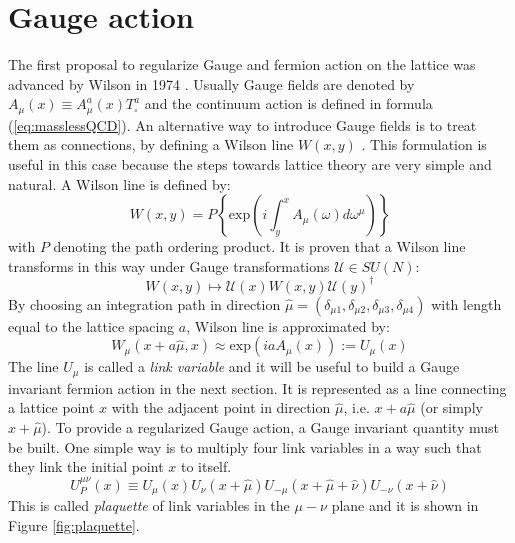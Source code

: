 \documentclass[english, LaM, oneside, noexaminfo]{sapthesis}
\begin{document}
\section{Gauge action}
\noindent
The first proposal to regularize Gauge and fermion action on the lattice was advanced by Wilson in 1974 \cite{Wilson-Confinement-of-Quarks}.
Usually Gauge fields are denoted by $A_\mu (x) \equiv A_\mu^a(x)T^a_{\square}$ and the continuum action is defined in formula (\ref{eq:masslessQCD}).
An alternative way to introduce Gauge fields is to treat them as connections, by defining a Wilson line $W(x,y)$ \cite{Schwartz}.
This formulation is useful in this case because the steps towards lattice theory are very simple and natural.
A Wilson line is defined by:
\begin{equation*}
    W(x,y) = P \left\{\text{exp}\left(i\int_y^x A_\mu(\omega)d\omega^\mu\right)\right\}
\end{equation*}
with $P$ denoting the path ordering product.
It is proven that a Wilson line transforms in this way under Gauge transformations $\mathcal{U}\in SU(N)$:
\begin{equation}\label{eq:wline-transformation}
    W(x,y) \longmapsto \mathcal{U}(x) W(x,y) \mathcal{U}(y)^\dagger
\end{equation}
By choosing an integration path in direction $\hat\mu = (\delta_{\mu 1},\delta_{\mu 2},\delta_{\mu 3},\delta_{\mu 4})$ with length equal to the lattice spacing $a$, Wilson line is approximated by:
\begin{equation*}
    W_\mu(x+a\hat\mu, x) \approx \text{exp}\left(iaA_\mu (x)\right) := U_\mu (x)
\end{equation*}
The line $U_\mu$ is called a {\it link variable} and it will be useful to build a Gauge invariant fermion action in the next section.
It is represented as a line connecting a lattice point $x$ with the adjacent point in direction $\hat\mu$, i.e. $x+a\hat\mu$ (or simply $x+\hat\mu$).
\newline
To provide a regularized Gauge action, a Gauge invariant quantity must be built.
One simple way is to multiply four link variables in a way such that they link the initial point $x$ to itself.
\begin{equation*}
    U_P^{\mu\nu}(x) \equiv U_\mu (x) U_\nu (x+\hat\mu) U_{-\mu} (x+\hat\mu+\hat\nu) U_{-\nu} (x+\hat\nu)
\end{equation*}
This is called {\it plaquette} of link variables in the $\mu-\nu$ plane and it is shown in Figure \ref{fig:plaquette}.
\end{document}
